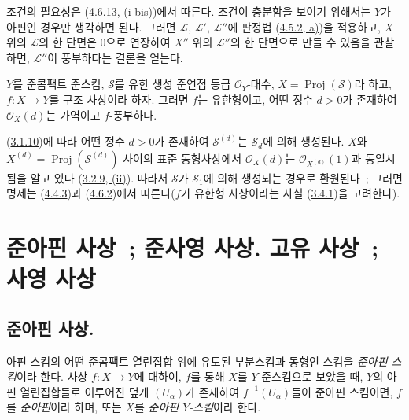 
조건의 필요성은
(\hyperref[II.4.6.13-ko]{4.6.13, (i bis)})에서 따른다. 조건이
충분함을 보이기 위해서는 $Y$가 아핀인 경우만 생각하면 된다. 그러면
$\mathcal{L}$, $\mathcal{L}'$, $\mathcal{L}''$에 판정법
(\hyperref[II.4.5.2-ko]{4.5.2, a)})을 적용하고, $X$ 위의
$\mathcal{L}$의 한 단면은 $0$으로 연장하여 $X''$ 위의
$\mathcal{L}''$의 한 단면으로 만들 수 있음을 관찰하면,
$\mathcal{L}''$이 풍부하다는 결론을 얻는다.

\begin{proposition}[4.6.18]
\label{II.4.6.18-ko}
$Y$를 준콤팩트 준스킴, $\mathcal{S}$를 유한 생성 준연접 등급
$\mathcal{O}_Y$-대수, $X=\operatorname{Proj}(\mathcal{S})$라 하고,
$f:X\to Y$를 구조 사상이라 하자. 그러면 $f$는 유한형이고, 어떤
정수 $d>0$가 존재하여 $\mathcal{O}_X(d)$는 가역이고 $f$-풍부하다.
\end{proposition}

(\hyperref[II.3.1.10-ko]{3.1.10})에 따라 어떤 정수 $d>0$가 존재하여
$\mathcal{S}^{(d)}$는 $\mathcal{S}_d$에 의해 생성된다.
$X$와 $X^{(d)}=\operatorname{Proj}(\mathcal{S}^{(d)})$ 사이의 표준
동형사상에서 $\mathcal{O}_X(d)$는 $\mathcal{O}_{X^{(d)}}(1)$과
동일시됨을 알고 있다
(\hyperref[II.3.2.9-ko]{3.2.9, (ii)}). 따라서 $\mathcal{S}$가
$\mathcal{S}_1$에 의해 생성되는 경우로 환원된다~; 그러면 명제는
(\hyperref[II.4.4.3-ko]{4.4.3})과
(\hyperref[II.4.6.2-ko]{4.6.2})에서 따른다($f$가 유한형 사상이라는
사실 (\hyperref[II.3.4.1-ko]{3.4.1})을 고려한다).

\section{준아핀 사상~; 준사영 사상. 고유 사상~; 사영 사상}
\label{section:II.5-ko}

\subsection{준아핀 사상.}
\label{subsection:II.5.1-ko}

\begin{definition}[5.1.1]
\label{II.5.1.1-ko}
아핀 스킴의 어떤 준콤팩트 열린집합 위에 유도된 부분스킴과 동형인 스킴을
\emph{준아핀 스킴}이라 한다. 사상 $f:X\to Y$에 대하여, $f$를 통해
$X$를 $Y$-준스킴으로 보았을 때, $Y$의 아핀 열린집합들로 이루어진 덮개
$(U_\alpha)$가 존재하여 $f^{-1}(U_\alpha)$들이 준아핀 스킴이면, $f$를
\emph{준아핀}이라 하며, 또는 $X$를 \emph{준아핀 $Y$-스킴}이라 한다.
\end{definition}

